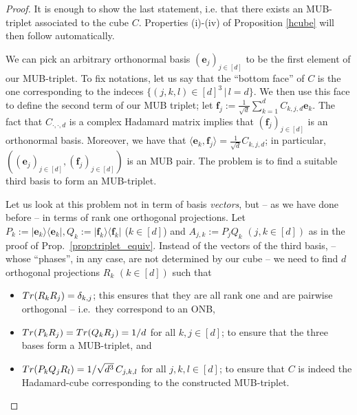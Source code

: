 \documentclass[10pt,a4paper]{amsart}
\newcommand{\eb}{\ensuremath{\mathbf{e}}}
\newcommand{\fb}{\ensuremath{\mathbf{f}}}
\begin{document}
\begin{proof}
It is enough to show the last statement, i.e. that there exists an MUB-triplet associated to the cube $C$. Properties (i)-(iv) of Proposition \ref{hcube} will then follow automatically. 

\medskip

We can pick an arbitrary orthonormal basis $(\eb_j)_{j\in [d]}$ to be the first element of our MUB-triplet. To fix notations, let us say that the ``bottom face'' of $C$ is the one corresponding to the indeces $\{(j,k,l)\in [d]^3\,|\, l=d\}$. We then use this face to  define the second term of our MUB triplet; let
$\fb_j:= \frac{1}{\sqrt{d}} \sum_{k=1}^d C_{k,j,d}\eb_k$. The fact that $C_{\cdot,\cdot,d}$ is a complex Hadamard matrix implies that 
$(\fb_j)_{j\in [d]}$ is an orthonormal basis. Moreover, we have that $\langle \eb_k,\fb_j\rangle =\frac{1}{\sqrt{d}} C_{k,j,d}$; in particular, $\left((\eb_j)_{j\in [d]},(\fb_j)_{j\in [d]}\right)$
is an MUB pair. The  problem is to find a suitable third basis to form an MUB-triplet.  

\medskip

Let us look at this problem not in term of basis {\it vectors}, but -- as we have done before -- in terms of rank one orthogonal projections. Let $P_k:=|\eb_k\rangle\langle\eb_k|, Q_k:= |\fb_k\rangle\langle\fb_k| $ ($k\in [d]$) and $A_{j,k}:=P_jQ_k$ $(j,k\in [d])$ as in the proof of Prop.\ \ref{prop:triplet_equiv}. Instead of the vectors of the third basis, -- whose ``phases'', in any case, are not determined by our cube -- we need to find $d$ orthogonal projections $R_k$ $(k\in [d])$ such that
\begin{itemize}
\item[(a)] ${\rm Tr}(R_k R_j)=\delta_{k,j}$; this ensures that they are all rank one and are pairwise orthogonal -- i.e.\ they correspond to an ONB,
\item[(b)] ${\rm Tr}(P_k R_j)={\rm Tr}(Q_k R_j)=1/d$ for all $k,j\in [d]$; to ensure that the three bases form a MUB-triplet, and
\item[(c)] ${\rm Tr}(P_k Q_jR_l)= 1/\sqrt{d^3} \, C_{j,k,l}$ for all $j,k,l\in [d]$; to ensure that $C$ is indeed the Hadamard-cube corresponding to the constructed MUB-triplet.
\end{itemize}


\end{proof}
\end{document}
